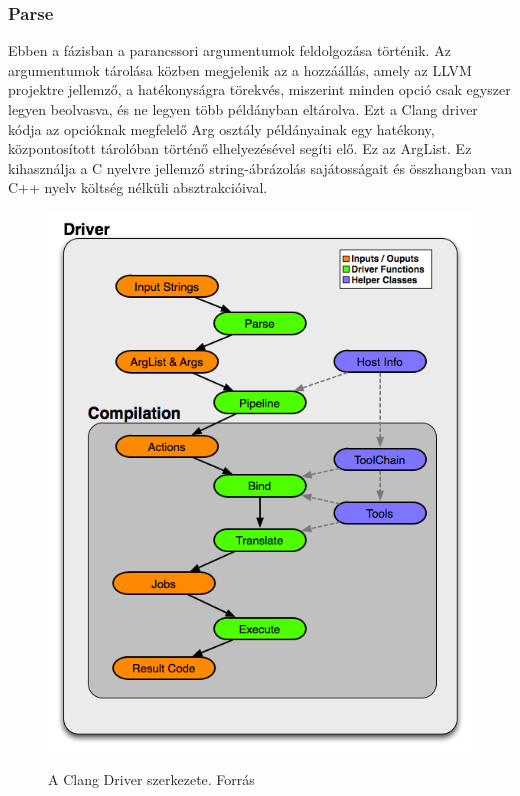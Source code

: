 \documentclass[a4paper,12pt]{report}
\begin{document}
\subsubsection{Parse}
Ebben a fázisban a parancssori argumentumok feldolgozása történik. Az argumentumok tárolása közben megjelenik az a hozzáállás, amely az LLVM projektre jellemző, a hatékonyságra törekvés, miszerint minden opció csak egyszer legyen beolvasva, és ne legyen több példányban eltárolva. Ezt a Clang driver kódja az opcióknak megfelelő Arg osztály példányainak egy hatékony, központosított tárolóban történő elhelyezésével segíti elő. Ez az ArgList. Ez kihasználja a C nyelvre jellemző string-ábrázolás sajátosságait és  összhangban van C++ nyelv költség nélküli absztrakcióival.

\begin{figure}[h]
\caption{A Clang Driver szerkezete. Forrás \cite{clangdriverimage}}
\centering
\includegraphics[scale=0.6]{DriverArchitecture.png}
\label{fig:clangdriver}
\end{figure}
\end{document}
